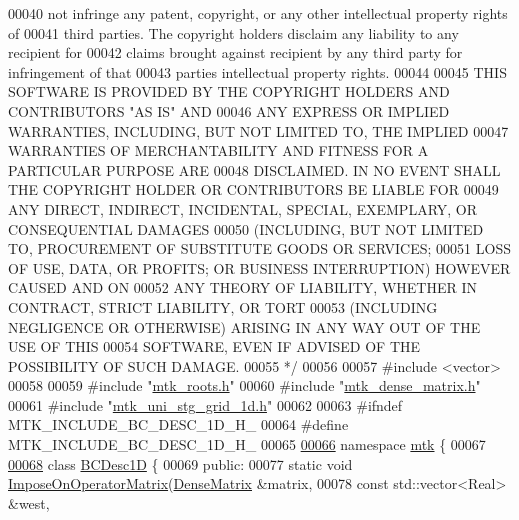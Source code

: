 \begin{DoxyCode}
00040 \textcolor{comment}{not infringe any patent, copyright, or any other intellectual property rights of}
00041 \textcolor{comment}{third parties. The copyright holders disclaim any liability to any recipient for}
00042 \textcolor{comment}{claims brought against recipient by any third party for infringement of that}
00043 \textcolor{comment}{parties intellectual property rights.}
00044 \textcolor{comment}{}
00045 \textcolor{comment}{THIS SOFTWARE IS PROVIDED BY THE COPYRIGHT HOLDERS AND CONTRIBUTORS "AS IS" AND}
00046 \textcolor{comment}{ANY EXPRESS OR IMPLIED WARRANTIES, INCLUDING, BUT NOT LIMITED TO, THE IMPLIED}
00047 \textcolor{comment}{WARRANTIES OF MERCHANTABILITY AND FITNESS FOR A PARTICULAR PURPOSE ARE}
00048 \textcolor{comment}{DISCLAIMED. IN NO EVENT SHALL THE COPYRIGHT HOLDER OR CONTRIBUTORS BE LIABLE FOR}
00049 \textcolor{comment}{ANY DIRECT, INDIRECT, INCIDENTAL, SPECIAL, EXEMPLARY, OR CONSEQUENTIAL DAMAGES}
00050 \textcolor{comment}{(INCLUDING, BUT NOT LIMITED TO, PROCUREMENT OF SUBSTITUTE GOODS OR SERVICES;}
00051 \textcolor{comment}{LOSS OF USE, DATA, OR PROFITS; OR BUSINESS INTERRUPTION) HOWEVER CAUSED AND ON}
00052 \textcolor{comment}{ANY THEORY OF LIABILITY, WHETHER IN CONTRACT, STRICT LIABILITY, OR TORT}
00053 \textcolor{comment}{(INCLUDING NEGLIGENCE OR OTHERWISE) ARISING IN ANY WAY OUT OF THE USE OF THIS}
00054 \textcolor{comment}{SOFTWARE, EVEN IF ADVISED OF THE POSSIBILITY OF SUCH DAMAGE.}
00055 \textcolor{comment}{*/}
00056 
00057 \textcolor{preprocessor}{#include <vector>}
00058 
00059 \textcolor{preprocessor}{#include "\hyperlink{mtk__roots_8h}{mtk\_roots.h}"}
00060 \textcolor{preprocessor}{#include "\hyperlink{mtk__dense__matrix_8h}{mtk\_dense\_matrix.h}"}
00061 \textcolor{preprocessor}{#include "\hyperlink{mtk__uni__stg__grid__1d_8h}{mtk\_uni\_stg\_grid\_1d.h}"}
00062 
00063 \textcolor{preprocessor}{#ifndef MTK\_INCLUDE\_BC\_DESC\_1D\_H\_}
00064 \textcolor{preprocessor}{#define MTK\_INCLUDE\_BC\_DESC\_1D\_H\_}
00065 
\hypertarget{mtk__bc__desc__1d_8h_source_l00066}{}\hyperlink{namespacemtk}{00066} \textcolor{keyword}{namespace }\hyperlink{namespacemtk}{mtk} \{
00067 
\hypertarget{mtk__bc__desc__1d_8h_source_l00068}{}\hyperlink{classmtk_1_1BCDesc1D}{00068} \textcolor{keyword}{class }\hyperlink{classmtk_1_1BCDesc1D}{BCDesc1D} \{
00069  \textcolor{keyword}{public}:
00077   \textcolor{keyword}{static} \textcolor{keywordtype}{void} \hyperlink{classmtk_1_1BCDesc1D_a5e5dcda1780b9aa404e836c4c27ac08f}{ImposeOnOperatorMatrix}(\hyperlink{classmtk_1_1DenseMatrix}{DenseMatrix} &matrix,
00078                                      \textcolor{keyword}{const} std::vector<Real> &west,

\end{DoxyCode}

